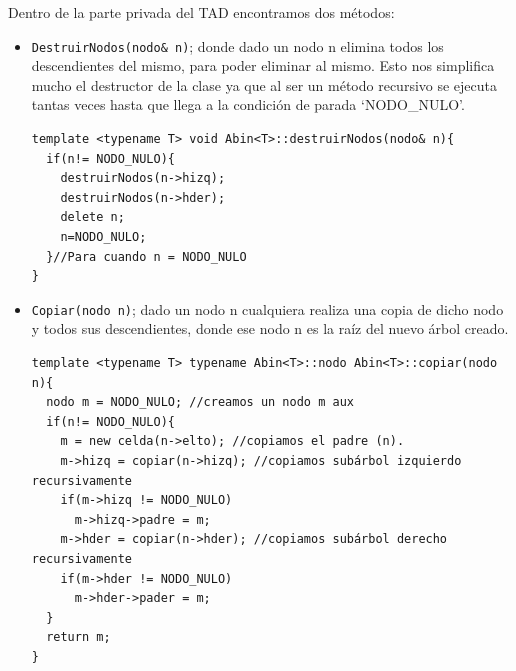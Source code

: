 Dentro de la parte privada del TAD encontramos dos métodos:
\begin{itemize}
  \item \verb|DestruirNodos(nodo& n)|; donde dado un nodo n elimina todos los descendientes del mismo, para poder eliminar al mismo. Esto nos simplifica mucho el destructor de la clase ya que al ser un método recursivo se ejecuta tantas veces hasta que llega a la condición de parada `NODO\_NULO'.
  \begin{verbatim}
template <typename T> void Abin<T>::destruirNodos(nodo& n){
  if(n!= NODO_NULO){
    destruirNodos(n->hizq);
    destruirNodos(n->hder);
    delete n;
    n=NODO_NULO;
  }//Para cuando n = NODO_NULO
}
  \end{verbatim}
  \item \verb|Copiar(nodo n)|; dado un nodo n cualquiera realiza una copia de dicho nodo y todos sus descendientes, donde ese nodo n es la raíz del nuevo árbol creado.
  \begin{verbatim}
template <typename T> typename Abin<T>::nodo Abin<T>::copiar(nodo n){
  nodo m = NODO_NULO; //creamos un nodo m aux
  if(n!= NODO_NULO){
    m = new celda(n->elto); //copiamos el padre (n).
    m->hizq = copiar(n->hizq); //copiamos subárbol izquierdo recursivamente
    if(m->hizq != NODO_NULO)
      m->hizq->padre = m;
    m->hder = copiar(n->hder); //copiamos subárbol derecho recursivamente
    if(m->hder != NODO_NULO)
      m->hder->pader = m;
  }
  return m;
}
  \end{verbatim}
\end{itemize}